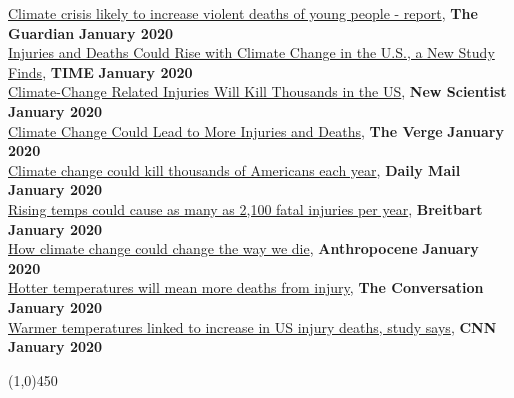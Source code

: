 \href{https://www.theguardian.com/environment/2020/jan/13/climate-crisis-likely-to-increase-violent-deaths-of-young-people-report}{Climate crisis likely to increase violent deaths of young people - report}, \textbf{The Guardian} \hfill \textbf{January 2020} \\
\href{https://time.com/5764673/injuries-deaths-climate-change/}{Injuries and Deaths Could Rise with Climate Change in the U.S., a New Study Finds}, \textbf{TIME} \hfill \textbf{January 2020} \\
\href{https://www.newscientist.com/article/2229627-climate-change-related-injuries-will-kill-thousands-in-the-us/}{Climate-Change Related Injuries Will Kill Thousands in the US}, \textbf{New Scientist} \hfill \textbf{January 2020} \\
\href{https://www.theverge.com/2020/1/13/21063690/climate-change-injuries-deaths-weather-violence-drowning-accidents}{Climate Change Could Lead to More Injuries and Deaths}, \textbf{The Verge} \hfill \textbf{January 2020} \\
\href{https://www.dailymail.co.uk/health/article-7882007/Global-temperatures-rising-just-3-degrees-lead-2-100-Americans-dying-year.html}{Climate change could kill thousands of Americans each year}, \textbf{Daily Mail} \hfill \textbf{January 2020} \\
\href{https://www.breitbart.com/news/rising-temps-could-cause-as-many-as-2100-fatal-injuries-per-year/}{Rising temps could cause as many as 2,100 fatal injuries per year}, \textbf{Breitbart} \hfill \textbf{January 2020} \\
\href{http://www.anthropocenemagazine.org/2020/01/how-climate-change-could-change-way-we-die/}{How climate change could change the way we die}, \textbf{Anthropocene} \hfill \textbf{January 2020} \\
\href{https://theconversation.com/car-accidents-drownings-violence-hotter-temperatures-will-mean-more-deaths-from-injury-129628}{Hotter temperatures will mean more deaths from injury}, \textbf{The Conversation} \hfill \textbf{January 2020} \\
\href{https://www.cnn.com/2020/01/13/health/warm-temperatures-injury-deaths-study/index.html}{Warmer temperatures linked to increase in US injury deaths, study says}, \textbf{CNN} \hfill \textbf{January 2020}


\begin{center} \line(1,0){450} \end{center}